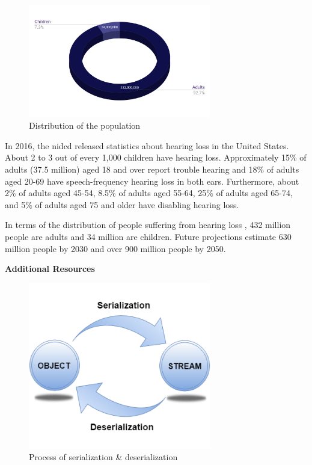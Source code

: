 \documentclass[twocolumn]{article}
\begin{document}
\begin{figure}[h]
\centering
\includegraphics[width=8cm]{./figures/distribution of the population}
\caption{Distribution of the population}
\end{figure}

In 2016, the \gls{nidcd} \cite{nidcd} released statistics about hearing loss 
in the United States. About 2 to 3 out of every 1,000 children have hearing 
loss. Approximately 15\% of adults (37.5 million) aged 18 and over report 
trouble hearing and 18\% of adults aged 20-69 have speech-frequency hearing 
loss in both ears. Furthermore, about 2\% of adults aged 45-54, 8.5\% of 
adults aged 55-64, 25\% of adults aged 65-74, and 5\% of adults aged 75 and 
older have disabling hearing loss.

In terms of the distribution of people suffering from hearing loss \cite{who}, 
432 million people are adults and 34 million are children. Future projections 
estimate 630 million people by 2030 and over 900 million people by 2050.




\listoffigures
\listoftables

\glsaddall
\setlength{\glsdescwidth}{0.8\textwidth}
\printglossary[type=\acronymtype,title=List Of Abbreviations]

\clearpage
\LARGE{\textbf{Additional Resources}}

\begin{figure}[h]
\centering
\includegraphics[width=8cm]{./figures/serialization and deserialization}
\caption{Process of serialization \& deserialization}
\end{figure}
\end{document}
